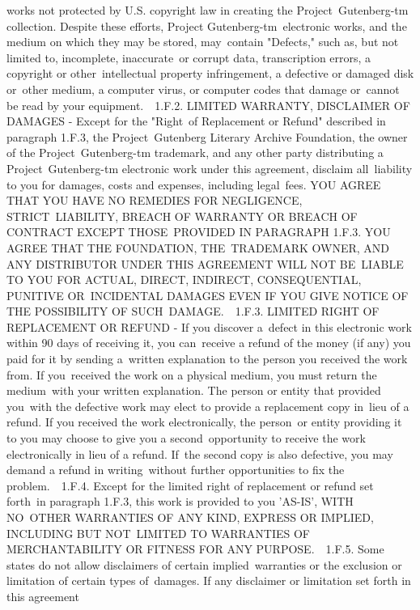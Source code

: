 {works not protected by U.S. copyright law in creating the Project\
Gutenberg-tm collection. Despite these efforts, Project Gutenberg-tm\
electronic works, and the medium on which they may be stored, may\
contain "Defects," such as, but not limited to, incomplete, inaccurate\
or corrupt data, transcription errors, a copyright or other\
intellectual property infringement, a defective or damaged disk or\
other medium, a computer virus, or computer codes that damage or\
cannot be read by your equipment.\
\
1.F.2. LIMITED WARRANTY, DISCLAIMER OF DAMAGES - Except for the "Right\
of Replacement or Refund" described in paragraph 1.F.3, the Project\
Gutenberg Literary Archive Foundation, the owner of the Project\
Gutenberg-tm trademark, and any other party distributing a Project\
Gutenberg-tm electronic work under this agreement, disclaim all\
liability to you for damages, costs and expenses, including legal\
fees. YOU AGREE THAT YOU HAVE NO REMEDIES FOR NEGLIGENCE, STRICT\
LIABILITY, BREACH OF WARRANTY OR BREACH OF CONTRACT EXCEPT THOSE\
PROVIDED IN PARAGRAPH 1.F.3. YOU AGREE THAT THE FOUNDATION, THE\
TRADEMARK OWNER, AND ANY DISTRIBUTOR UNDER THIS AGREEMENT WILL NOT BE\
LIABLE TO YOU FOR ACTUAL, DIRECT, INDIRECT, CONSEQUENTIAL, PUNITIVE OR\
INCIDENTAL DAMAGES EVEN IF YOU GIVE NOTICE OF THE POSSIBILITY OF SUCH\
DAMAGE.\
\
1.F.3. LIMITED RIGHT OF REPLACEMENT OR REFUND - If you discover a\
defect in this electronic work within 90 days of receiving it, you can\
receive a refund of the money (if any) you paid for it by sending a\
written explanation to the person you received the work from. If you\
received the work on a physical medium, you must return the medium\
with your written explanation. The person or entity that provided you\
with the defective work may elect to provide a replacement copy in\
lieu of a refund. If you received the work electronically, the person\
or entity providing it to you may choose to give you a second\
opportunity to receive the work electronically in lieu of a refund. If\
the second copy is also defective, you may demand a refund in writing\
without further opportunities to fix the problem.\
\
1.F.4. Except for the limited right of replacement or refund set forth\
in paragraph 1.F.3, this work is provided to you 'AS-IS', WITH NO\
OTHER WARRANTIES OF ANY KIND, EXPRESS OR IMPLIED, INCLUDING BUT NOT\
LIMITED TO WARRANTIES OF MERCHANTABILITY OR FITNESS FOR ANY PURPOSE.\
\
1.F.5. Some states do not allow disclaimers of certain implied\
warranties or the exclusion or limitation of certain types of\
damages. If any disclaimer or limitation set forth in this agreement\
}
